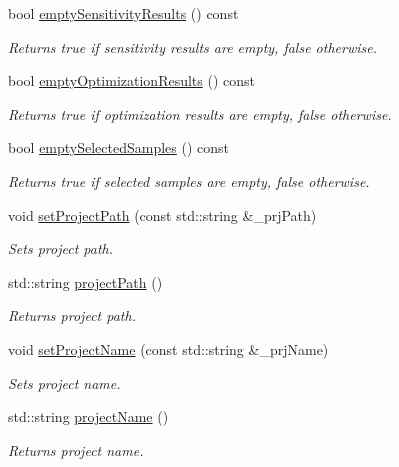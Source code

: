 \begin{DoxyCompactItemize}
bool \hyperlink{class_go_s_u_m_1_1_c_container_a56f4fd6eefa38f92032c3a166e8a052c}{empty\-Sensitivity\-Results} () const 
\begin{DoxyCompactList}\small\item\em Returns true if sensitivity results are empty, false otherwise. \end{DoxyCompactList}\item 
bool \hyperlink{class_go_s_u_m_1_1_c_container_a29e43ab71e35275c88f6a6db2a82d00d}{empty\-Optimization\-Results} () const 
\begin{DoxyCompactList}\small\item\em Returns true if optimization results are empty, false otherwise. \end{DoxyCompactList}\item 
bool \hyperlink{class_go_s_u_m_1_1_c_container_a531b0b177ff8910f5745055a930d72a2}{empty\-Selected\-Samples} () const 
\begin{DoxyCompactList}\small\item\em Returns true if selected samples are empty, false otherwise. \end{DoxyCompactList}\item 
void \hyperlink{class_go_s_u_m_1_1_c_container_a1400de60bc73d3dc4016c727d7f4e1e7}{set\-Project\-Path} (const std\-::string \&\-\_\-prj\-Path)
\begin{DoxyCompactList}\small\item\em Sets project path. \end{DoxyCompactList}\item 
std\-::string \hyperlink{class_go_s_u_m_1_1_c_container_a1e1139b32d1bf7f30af45f5d0cbbf33e}{project\-Path} ()
\begin{DoxyCompactList}\small\item\em Returns project path. \end{DoxyCompactList}\item 
void \hyperlink{class_go_s_u_m_1_1_c_container_a4f1576a5668f0a06927afc80a107c6f5}{set\-Project\-Name} (const std\-::string \&\-\_\-prj\-Name)
\begin{DoxyCompactList}\small\item\em Sets project name. \end{DoxyCompactList}\item 
std\-::string \hyperlink{class_go_s_u_m_1_1_c_container_aaa8d02f418180b2cbfd5de01868b4c1f}{project\-Name} ()
\begin{DoxyCompactList}\small\item\em Returns project name. \end{DoxyCompactList}\item 

\end{DoxyCompactItemize}
